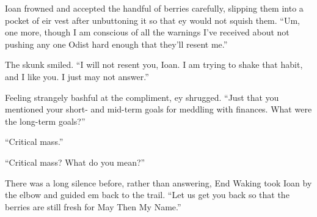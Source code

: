 Ioan frowned and accepted the handful of berries carefully, slipping them into a pocket of eir vest after unbuttoning it so that ey would not squish them. ``Um, one more, though I am conscious of all the warnings I've received about not pushing any one Odist hard enough that they'll resent me.''

The skunk smiled. ``I will not resent you, Ioan. I am trying to shake that habit, and I like you. I just may not answer.''

Feeling strangely bashful at the compliment, ey shrugged. ``Just that you mentioned your short- and mid-term goals for meddling with finances. What were the long-term goals?''

``Critical mass.''

``Critical mass? What do you mean?''

There was a long silence before, rather than answering, End Waking took Ioan by the elbow and guided em back to the trail. ``Let us get you back so that the berries are still fresh for May Then My Name.''
